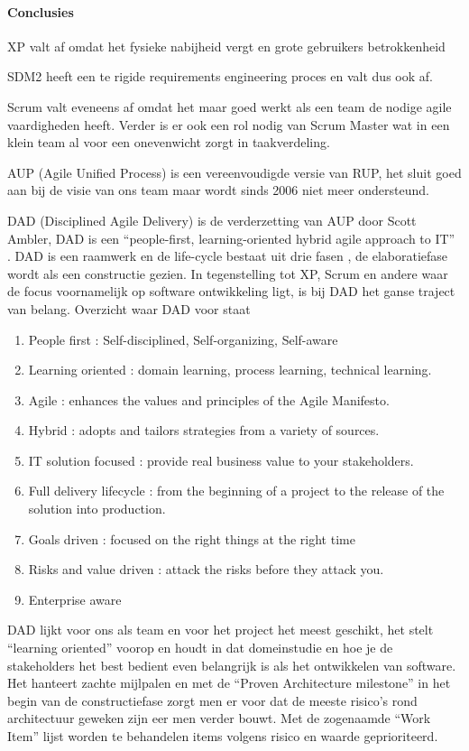 \paragraph{Conclusies}
\begin{description}
\item XP valt af omdat het fysieke nabijheid vergt en grote gebruikers betrokkenheid
\item SDM2 heeft een te rigide requirements engineering proces en valt dus ook af.
\item Scrum valt eveneens af omdat het maar goed werkt als een team de nodige agile vaardigheden heeft.
	Verder is er ook een rol nodig van Scrum Master wat in een klein team al
	voor een onevenwicht zorgt in taakverdeling.
\item AUP (Agile Unified Process) is een vereenvoudigde versie van RUP, het sluit goed aan
	bij de visie van ons team maar wordt sinds 2006 niet meer ondersteund.
\item DAD (Disciplined Agile Delivery) is de verderzetting van AUP door Scott Ambler, DAD
    is een ``people-first, learning-oriented hybrid agile approach to IT'' . DAD is een raamwerk en
    de life-cycle bestaat uit drie fasen , de elaboratiefase wordt als een constructie gezien.
    In tegenstelling tot XP, Scrum en andere waar de focus voornamelijk op software ontwikkeling
    ligt, is bij DAD het ganse traject van belang.
Overzicht waar DAD voor staat
	\begin{enumerate}
		\item People first : Self-disciplined, Self-organizing, Self-aware
		\item Learning oriented : domain learning, process learning, technical learning.
		\item Agile : enhances the values and principles of the Agile Manifesto.
		\item Hybrid : adopts and tailors strategies from a variety of sources.
		\item IT solution focused :  provide real business value to your stakeholders.
		\item Full delivery lifecycle : from the beginning of a project to the release of the solution into production.
		\item Goals driven : focused on the right things at the right time
		\item Risks and value driven : attack the risks before they attack you.
		\item Enterprise aware
	\end{enumerate}


DAD lijkt voor ons als team en voor het project het meest geschikt, het stelt
``learning oriented'' voorop en houdt in dat domeinstudie en hoe je de stakeholders
het best bedient even belangrijk is als het ontwikkelen van software. Het hanteert
zachte mijlpalen en met de ``Proven Architecture milestone''  in het begin van de
constructiefase zorgt men er voor dat de meeste risico's rond architectuur geweken
zijn eer men verder bouwt. Met de zogenaamde ``Work Item''  lijst worden te behandelen
items volgens risico en waarde geprioriteerd.

\end{description}